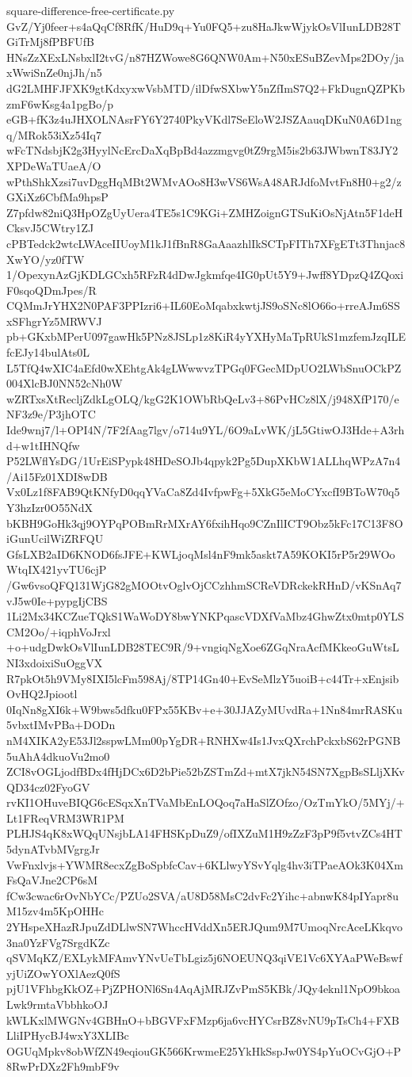 \documentclass[11pt]{article}
\theoremstyle{definition}
\theoremstyle{remark}
\begin{document}
\begin{filecontents*}[overwrite]{square-difference-free-certificate.py}
GvZ/Yj0feer+s4aQqCf8RfK/HuD9q+Yu0FQ5+zu8HaJkwWjykOsVlIunLDB28TGiTrMj8fPBFUfB
HNsZzXExLNsbxlI2tvG/n87HZWowe8G6QNW0Am+N50xESuBZevMps2DOy/jaxWwiSnZe0njJh/n5
dG2LMHFJFXK9gtKdxyxwVsbMTD/ilDfwSXbwY5nZfImS7Q2+FkDugnQZPKbzmF6wKsg4a1pgBo/p
eGB+fK3z4uJHXOLNAsrFY6Y2740PkyVKdl7SeEloW2JSZAauqDKuN0A6D1ngq/MRok53iXz54Iq7
wFcTNdsbjK2g3HyylNcErcDaXqBpBd4azzmgvg0tZ9rgM5is2b63JWbwnT83JY2XPDeWaTUaeA/O
wPthShkXzsi7uvDggHqMBt2WMvAOo8H3wVS6WsA48ARJdfoMvtFn8H0+g2/zGXiXz6CbfMa9hpsP
Z7pfdw82niQ3HpOZgUyUera4TE5s1C9KGi+ZMHZoignGTSuKiOsNjAtn5F1deHCksvJ5CWtry1ZJ
cPBTedck2wtcLWAceIIUoyM1kJ1fBnR8GaAaazhlIkSCTpFITh7XFgETt3Thnjac8XwYO/yz0fTW
1/OpexynAzGjKDLGCxh5RFzR4dDwJgkmfqe4IG0pUt5Y9+Jwff8YDpzQ4ZQoxiF0sqoQDmJpes/R
CQMmJrYHX2N0PAF3PPIzri6+IL60EoMqabxkwtjJS9oSNc8lO66o+rreAJm6SSxSFhgrYz5MRWVJ
pb+GKxbMPerU097gawHk5PNz8JSLp1z8KiR4yYXHyMaTpRUkS1mzfemJzqILEfcEJy14bulAts0L
L5TfQ4wXIC4aEfd0wXEhtgAk4gLWwwvzTPGq0FGecMDpUO2LWbSnuOCkPZ004XlcBJ0NN52cNh0W
wZRTxsXtRecljZdkLgOLQ/kgG2K1OWbRbQeLv3+86PvHCz8lX/j948XfP170/eNF3z9e/P3jhOTC
Ide9wnj7/l+OPI4N/7F2fAag7lgv/o714u9YL/6O9aLvWK/jL5GtiwOJ3Hde+A3rhd+w1tIHNQfw
P52LWflYsDG/1UrEiSPypk48HDeSOJb4qpyk2Pg5DupXKbW1ALLhqWPzA7n4/Ai15Fz01XDI8wDB
Vx0Lz1f8FAB9QtKNfyD0qqYVaCa8Zd4IvfpwFg+5XkG5eMoCYxcfI9BToW70q5Y3hzIzr0O55NdX
bKBH9GoHk3qj9OYPqPOBmRrMXrAY6fxihHqo9CZnIlICT9Obz5kFc17C13F8OiGunUcilWiZRFQU
GfsLXB2aID6KNOD6fsJFE+KWLjoqMsl4nF9mk5askt7A59KOKI5rP5r29WOoWtqIX421yvTU6cjP
/Gw6vsoQFQ131WjG82gMOOtvOglvOjCCzhhmSCReVDRckekRHnD/vKSnAq7vJ5w0Ie+pypgIjCBS
1Li2Mx34KCZueTQkS1WaWoDY8bwYNKPqascVDXfVaMbz4GhwZtx0mtp0YLSCM2Oo/+iqphVoJrxl
+o+udgDwkOsVlIunLDB28TEC9R/9+vngiqNgXoe6ZGqNraAcfMKkeoGuWtsLNI3xdoixiSuOggVX
R7pkOt5h9VMy8IXI5lcFm598Aj/8TP14Gn40+EvSeMlzY5uoiB+c44Tr+xEnjsibOvHQ2Jpiootl
0IqNn8gXI6k+W9bws5dfku0FPx55KBv+e+30JJAZyMUvdRa+1Nn84mrRASKu5vbxtIMvPBa+DODn
nM4XIKA2yE53Jl2sspwLMm00pYgDR+RNHXw4Is1JvxQXrchPckxbS62rPGNB5uAhA4dkuoVu2mo0
ZCI8vOGLjodfBDx4fHjDCx6D2bPie52bZSTmZd+mtX7jkN54SN7XgpBsSLljXKvQD34cz02FyoGV
rvKI1OHuveBIQG6cESqxXnTVaMbEnLOQoq7aHaSlZOfzo/OzTmYkO/5MYj/+Lt1FReqVRM3WR1PM
PLHJS4qK8xWQqUNsjbLA14FHSKpDuZ9/ofIXZuM1H9zZzF3pP9f5vtvZCs4HT5dynATvbMVgrgJr
VwFnxlvjs+YWMR8ecxZgBoSpbfcCav+6KLlwyYSvYqlg4hv3iTPaeAOk3K04XmFsQaVJne2CP6sM
fCw3cwac6rOvNbYCc/PZUo2SVA/aU8D58MsC2dvFc2Yihc+abnwK84pIYapr8uM15zv4m5KpOHHc
2YHspeXHazRJpuZdDLlwSN7WhccHVddXn5ERJQum9M7UmoqNrcAceLKkqvo3na0YzFVg7SrgdKZc
qSVMqKZ/EXLykMFAmvYNvUeTbLgiz5j6NOEUNQ3qiVE1Vc6XYAaPWeBswfyjUiZOwYOXlAezQ0fS
pjU1VFhbgKkOZ+PjZPHONl6Sn4AqAjMRJZvPmS5KBk/JQy4eknl1NpO9bkoaLwk9rmtaVbbhkoOJ
kWLKxlMWGNv4GBHnO+bBGVFxFMzp6ja6vcHYCsrBZ8vNU9pTsCh4+FXBLliIPHycBJ4wxY3XLIBc
OGUqMpkv8obWfZN49eqiouGK566KrwmeE25YkHkSspJw0YS4pYuOCvGjO+P8RwPrDXz2Fh9mbF9v

\end{filecontents*}
\end{document}
